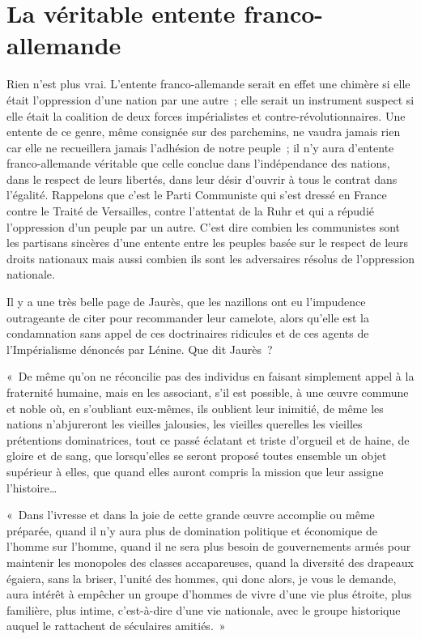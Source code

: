 \documentclass[french,twoside]{book} %
\newenvironment{quoteblock}%
  {\begin{quoting}}
  {\end{quoting}}
\newenvironment{quotebar}{%
    \def\FrameCommand{{\color{rubric!10!}\vrule width 0.5em} \hspace{0.9em}}%
    \def\OuterFrameSep{\itemsep} %
    \MakeFramed {\advance\hsize-\width \FrameRestore}
  }%
  {%
    \endMakeFramed
  }
\renewenvironment{quoteblock}%
  {%
    \savenotes
    \setstretch{0.9}
    \normalfont
    \begin{quotebar}
  }
  {%
    \end{quotebar}
    \spewnotes
  }
\begin{document}
\section[La véritable entente franco-allemande]{La véritable entente franco-allemande}
\noindent Rien n’est plus vrai. L’entente franco-allemande serait en effet une chimère si elle était l’oppression d’une nation par une autre ; elle serait un instrument suspect si elle était la coalition de deux forces impérialistes et contre-révolutionnaires. Une entente de ce genre, même consignée sur des parchemins, ne vaudra jamais rien car elle ne recueillera jamais l’adhésion de notre peuple ; il n’y aura d’entente franco-allemande véritable que celle conclue dans l’indépendance des nations, dans le respect de leurs libertés, dans leur désir d’ouvrir à tous le contrat dans l’égalité. Rappelons que c’est le Parti Communiste qui s’est dressé en France contre le Traité de Versailles, contre l’attentat de la Ruhr et qui a répudié l’oppression d’un peuple par un autre. C’est dire combien les communistes sont les partisans sincères d’une entente entre les peuples basée sur le respect de leurs droits nationaux mais aussi combien ils sont les adversaires résolus de l’oppression nationale.\par
Il y a une très belle page de Jaurès, que les nazillons ont eu l’impudence outrageante de citer pour recommander leur camelote, alors qu’elle est la condamnation sans appel de ces doctrinaires ridicules et de ces agents de l’Impérialisme dénoncés par Lénine. Que dit Jaurès ?\par

\begin{quoteblock}
 \noindent « De même qu’on ne réconcilie pas des individus en faisant simplement appel à la fraternité humaine, mais en les associant, s’il est possible, à une œuvre commune et noble où, en s’oubliant eux-mêmes, ils oublient leur inimitié, de même les nations n’abjureront les vieilles jalousies, les vieilles querelles les vieilles prétentions dominatrices, tout ce passé éclatant et triste d’orgueil et de haine, de gloire et de sang, que lorsqu’elles se seront proposé toutes ensemble un objet supérieur à elles, que quand elles auront compris la mission que leur assigne l’histoire…\par
 « Dans l’ivresse et dans la joie de cette grande œuvre accomplie ou même préparée, quand il n’y aura plus de domination politique et économique de l’homme sur l’homme, quand il ne sera plus besoin de gouvernements armés pour maintenir les monopoles des classes accapareuses, quand la diversité des drapeaux égaiera, sans la briser, l’unité des hommes, qui donc alors, je vous le demande, aura intérêt à empêcher un groupe d’hommes de vivre d’une vie plus étroite, plus familière, plus intime, c’est-à-dire d’une vie nationale, avec le groupe historique auquel le rattachent de séculaires amitiés. »
 \end{quoteblock}
\end{document}
